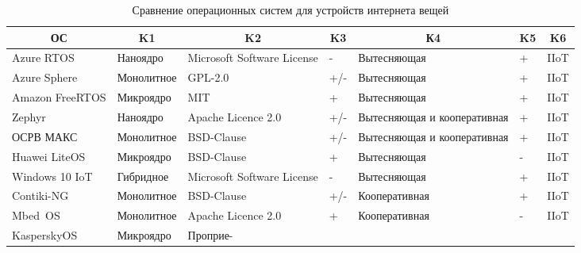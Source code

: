 \clearpage
\noindent
\captionsetup{format=hang,justification=raggedright,
	singlelinecheck=off}
\begin{longtable}[Hc]{|p{2.8cm}|p{2.6cm}|p{2.5cm}|p{0.6cm}|p{3.5cm}|p{0.6cm}|p{1cm}|}
	\caption{Сравнение операционных систем для устройств интернета вещей\label{tbl:cmp}}\\
	\hline
	\multicolumn{1}{|c}{\textbf{ОС}} & \multicolumn{1}{|c|}{\textbf{K1}} &
	\multicolumn{1}{c|}{\textbf{K2}} & \multicolumn{1}{c}{\textbf{K3}} &
	\multicolumn{1}{|c|}{\textbf{К4}} & \multicolumn{1}{c|}{\textbf{K5}} & 
	\multicolumn{1}{c|}{\textbf{K6}}\\
	\hline
	Azure RTOS    		& Наноядро 	 & Microsoft
	\linebreak Software
	\linebreak License     & -   & Вытесняющая 			   & + & IIoT\\*
	\hline
	Azure Sphere  		& Монолитное & GPL-2.0        & +/- & Вытесняющая 			   & + & IIoT\\*
	\hline
	Amazon
	\linebreak FreeRTOS & Микроядро  & MIT                    & +   & Вытесняющая 			   & + & IIoT\\*
	\hline
	Zephyr              & Наноядро 	 & Apache
	\linebreak Licence 2.0 & +/- & Вытесняющая и кооперативная & + & IIoT\\*
	\hline
	ОСРВ МАКС           & Монолитное & BSD\linebreak 3-Clause     & +/- & Вытесняющая и кооперативная & + & IIoT\\
	\hline
	Huawei
	\linebreak LiteOS   & Микроядро  & BSD\linebreak 3-Clause     & +   & Вытесняющая 			   & - & IIoT\\
	\hline
	Windows 10
	\linebreak IoT   	& Гибридное  & Microsoft
	\linebreak Software
	\linebreak License     & -   & Вытесняющая 			   & + & IIoT\\
	\hline
	Contiki-NG          & Монолитное & BSD\linebreak 3-Clause     & +/- & Кооперативная 		   & + & IIoT\\
	\hline
	Mbed~OS       		& Монолитное & Apache
	\linebreak Licence 2.0 & +   & Кооперативная 		   & - & IIoT\\
	\hline
	KasperskyOS         & Микроядро  & Проприе-

\end{longtable}
